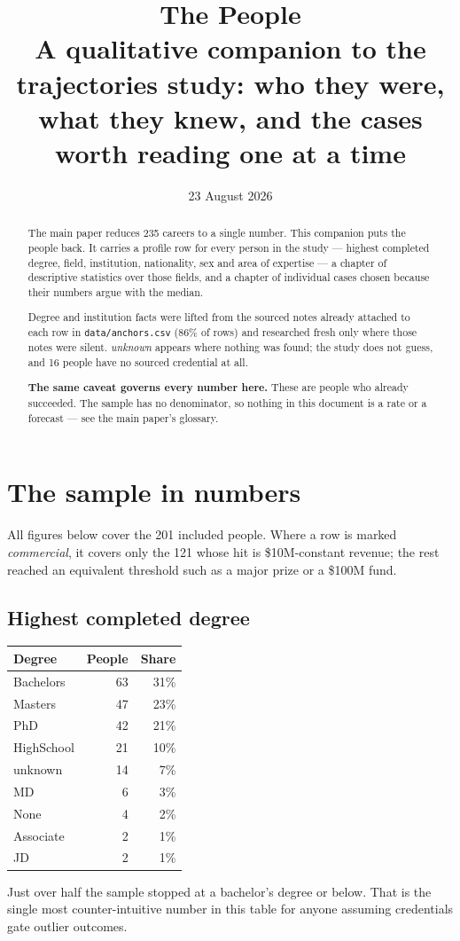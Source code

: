 \documentclass[11pt]{article}
\title{\bfseries The People\\[0.35em]
\large A qualitative companion to the trajectories study: who they were,
what they knew, and the cases worth reading one at a time}
\date{\normalsize 23 August 2026}
\begin{document}
\maketitle

\begin{abstract}
\noindent The main paper reduces 235 careers to a single number. This companion
puts the people back. It carries a profile row for every person in the study ---
highest completed degree, field, institution, nationality, sex and area of
expertise --- a chapter of descriptive statistics over those fields, and a
chapter of individual cases chosen because their numbers argue with the median.

Degree and institution facts were lifted from the sourced notes already attached
to each row in \texttt{data/anchors.csv} (86\% of rows) and researched fresh only
where those notes were silent. \emph{unknown} appears where nothing was found;
the study does not guess, and 16 people have no sourced credential at all.

\vspace{0.6em}
\noindent\textbf{The same caveat governs every number here.} These are people
who already succeeded. The sample has no denominator, so nothing in this
document is a rate or a forecast --- see the main paper's glossary.
\end{abstract}

\clearpage
\section{The sample in numbers}

All figures below cover the 201 included people. Where a row is marked \emph{commercial}, it covers only the 121 whose hit is \$10M-constant revenue; the rest reached an equivalent threshold such as a major prize or a \$100M fund.

\subsection{Highest completed degree}

\begin{center}\begin{tabular}{lrr}\toprule Degree & People & Share \\\midrule
Bachelors & 63 & 31\% \\
Masters & 47 & 23\% \\
PhD & 42 & 21\% \\
HighSchool & 21 & 10\% \\
unknown & 14 & 7\% \\
MD & 6 & 3\% \\
None & 4 & 2\% \\
Associate & 2 & 1\% \\
JD & 2 & 1\% \\
\bottomrule\end{tabular}\end{center}
Just over half the sample stopped at a bachelor's degree or below. That is the single most counter-intuitive number in this table for anyone assuming credentials gate outlier outcomes.
\end{document}
